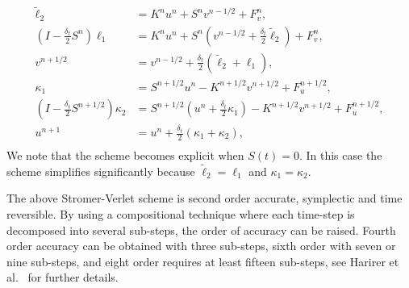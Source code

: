 \documentclass[11pt]{article}
\begin{document}
\begin{align*}
  \widetilde{\ell}_2 &= K^{n} u^{n} + S^{n} v^{n-1/2} + F_v^{n},\\
  \left(I - \frac{\delta_t}{2} S^{n}\right) \ell_1 &= K^n u^n + S^n \left( v^{n-1/2} +
  \frac{\delta_t}{2} \widetilde{\ell}_2 \right) + F_v^n,\\
%
  v^{n+1/2} &= v^{n-1/2} + \frac{\delta_t}{2}\left( \widetilde{\ell}_2 + \ell_1\right),\\
  \kappa_1 &= S^{n+1/2} u^n - K^{n+1/2} v^{n+1/2} +
  F_u^{n+1/2},\\
%
  \left(I - \frac{\delta_t}{2} S^{n+1/2}\right) \kappa_2 &= S^{n+1/2}\left( u^n + \frac{\delta_t}{2}
  \kappa_1 \right) - K^{n+1/2}  v^{n+1/2} + F_u^{n+1/2},\\
  u^{n+1} &= u^n + \frac{\delta_t}{2}\left( \kappa_1 + \kappa_2 \right),\\
%
\end{align*}
We note that the scheme becomes explicit when $S(t)=0$. In this case the scheme simplifies
significantly because $\widetilde{\ell}_2 = \ell_1$ and $\kappa_1 = \kappa_2$.

The above Stromer-Verlet scheme is second order accurate, symplectic and time reversible. By using a
compositional technique where each time-step is decomposed into several sub-steps, the order of
accuracy can be raised. Fourth order accuracy can be obtained with three sub-steps, sixth order with
seven or nine sub-steps, and eight order requires at least fifteen sub-steps, see Harirer et
al.~\cite{HairerLubichWanner-06} for further details.



\end{document}
